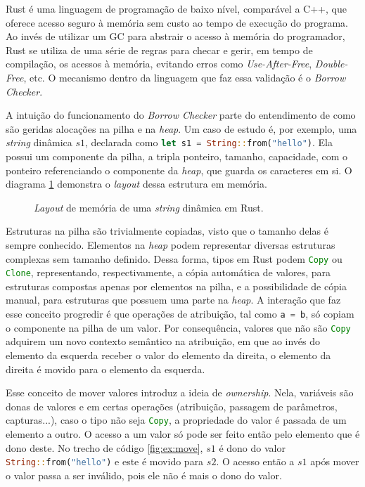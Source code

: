 Rust é uma linguagem de programação de baixo nível, comparável a C++, que oferece acesso seguro à memória sem custo ao tempo de execução do programa. Ao invés de utilizar um GC para abstrair o acesso à memória do programador, Rust se utiliza de uma série de regras para checar e gerir, em tempo de compilação, os acessos à memória, evitando erros como \emph{Use-After-Free}, \emph{Double-Free}, etc. O mecanismo dentro da linguagem que faz essa validação é o \emph{Borrow Checker}. 

A intuição do funcionamento do \emph{Borrow Checker} parte do entendimento de como são geridas alocações na pilha e na \emph{heap}. Um caso de estudo é, por exemplo, uma \emph{string} dinâmica $s1$, declarada como \lstinline[language=Rust]|let s1 = String::from("hello")|. Ela possui um componente da pilha, a tripla ponteiro, tamanho, capacidade, com o ponteiro referenciando o componente da \emph{heap}, que guarda os caracteres em si. O diagrama \ref{fig:svg:mem-layout} demonstra o \emph{layout} dessa estrutura em memória.

\begin{figure}[ht]
	\centering
	\caption{\emph{Layout} de memória de uma \emph{string} dinâmica em Rust.}
	\label{fig:svg:mem-layout}
	
\end{figure}

Estruturas na pilha são trivialmente copiadas, visto que o tamanho delas é sempre conhecido. Elementos na \emph{heap} podem representar diversas estruturas complexas sem tamanho definido.  Dessa forma, tipos em Rust podem \lstinline[language=Rust]|Copy| ou \lstinline[language=Rust]|Clone|, representando, respectivamente, a cópia automática de valores, para estruturas compostas apenas por elementos na pilha, e a possibilidade de cópia manual, para estruturas que possuem uma parte na \emph{heap}. A interação que faz esse conceito progredir é que operações de atribuição, tal como \lstinline[language=Rust]|a = b|, só copiam o componente na pilha de um valor. Por consequência, valores que não são \lstinline[language=Rust]|Copy| adquirem um novo contexto semântico na atribuição, em que ao invés do elemento da esquerda receber o valor do elemento da direita, o elemento da direita é movido para o elemento da esquerda. 

Esse conceito de mover valores introduz a ideia de \emph{ownership}. Nela, variáveis são donas de valores e em certas operações (atribuição, passagem de parâmetros, capturas...), caso o tipo não seja \lstinline[language=Rust]|Copy|, a propriedade do valor é passada de um elemento a outro. O acesso a um valor só pode ser feito então pelo elemento que é dono deste. No trecho de código \ref{fig:ex:move}, $s1$ é dono do valor \lstinline[language=Rust]|String::from("hello")| e este é movido para $s2$. O acesso então a $s1$ após mover o valor passa a ser inválido, pois ele não é mais o dono do valor.

